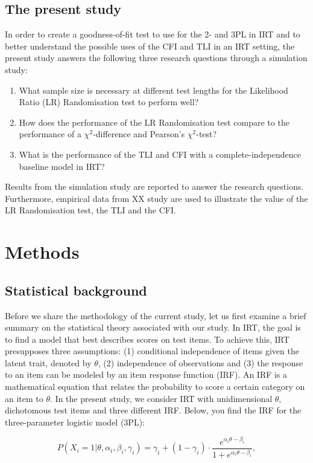 \documentclass[Royal,sageapa,times,doublespace]{sagej}
\begin{document}
\subsection{The present study}
In order to create a goodness-of-fit test to use for the 2- and 3PL in IRT and to better understand the possible uses of the CFI and TLI in an IRT setting, the present study answers the following three research questions through a simulation study:
\begin{enumerate}
\item{What sample size is necessary at different test lengths for the Likelihood Ratio (LR) Randomisation test to perform well?}
\item{How does the performance of the LR Randomisation test compare to the performance of a $\chi^2$-difference and Pearson's $\chi^2$-test?}
\item{What is the performance of the TLI and CFI with a complete-independence baseline model in IRT?}
\end{enumerate}
Results from the simulation study are reported to answer the research questions. Furthermore, empirical data from XX study are used to illustrate the value of the LR Randomisation test, the TLI and the CFI.

\section{Methods}
\subsection{Statistical background}
Before we share the methodology of the current study, let us first examine a brief summary on the statistical theory associated with our study. In IRT, the goal is to find a model that best describes scores on test items. To achieve this, IRT presupposes three assumptions: (1) conditional independence of items given the latent trait, denoted by $\theta$, (2) independence of observations and (3) the response to an item can be modeled by an item response function (IRF). An IRF is a mathematical equation that relates the probability to score a certain category on an item to $\theta$. In the present study, we consider IRT with unidimensional $\theta$, dichotomous test items and three different IRF. Below, you find the IRF for the three-parameter logistic model (3PL):

\begin{equation}
P(X_i = 1 | \theta, \alpha_{i}, \beta_{i}, \gamma_{i}) = \gamma_{i} + (1 - \gamma_{i}) \cdot 
\frac{e^{\alpha_{i}\theta - \beta_{i}}}{1 + e^{\alpha_{i}\theta - \beta_{i}}},
\end{equation}
\end{document}
